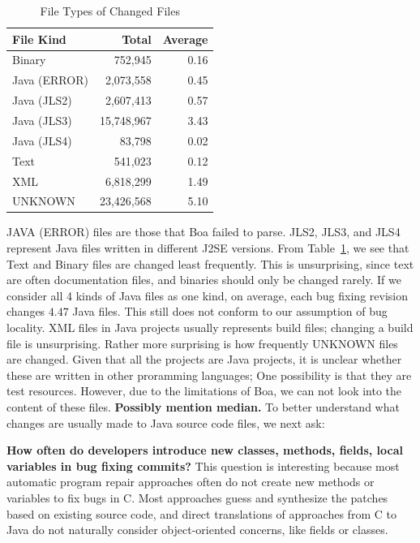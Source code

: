 \documentclass{sig-alternate-05-2015}
\newcommand{\todo}[1]
  {{\scriptsize \textbf{\color{red} {#1}}}}
\begin{document}
\begin{table}
\centering
  \begin{tabular}{ l | r  r }
  \toprule
  File Kind & Total & Average \\ 
  \midrule
  Binary & 752,945 & 0.16 \\ 
  Java (ERROR) & 2,073,558 & 0.45 \\ 
  Java (JLS2) & 2,607,413 & 0.57 \\ 
  Java (JLS3) & 15,748,967 & 3.43 \\
  Java (JLS4)  & 83,798 & 0.02 \\ 
  Text & 541,023 & 0.12 \\ 
  XML & 6,818,299 & 1.49 \\ 
  UNKNOWN & 23,426,568 & 5.10 \\ 
  \end{tabular}
  \caption{File Types of Changed Files}
  \label{tbl:fileType}
\end{table}

JAVA (ERROR) files are those that Boa failed to parse. JLS2,
JLS3, and JLS4 represent Java files written in different J2SE versions. From
Table~\ref{tbl:fileType}, we see that Text and Binary files are
changed least frequently. This is unsurprising, since text are often
documentation files, and binaries should only be changed rarely. If we consider all 4 kinds of Java
files as one kind, on average, each bug fixing revision changes $4.47$ Java
files. This still does not conform to our assumption of bug locality. XML
files in Java projects usually represents build files; changing a build
file is unsurprising.  Rather more surprising is how frequently UNKNOWN files
are changed. Given that all the projects are Java projects, 
it is unclear whether these are written in other proramming
languages; One possibility is
that they are test resources. However, due to the limitations of Boa, we can not
look into the content of these files. 
\todo{Possibly mention median.} 
To better understand what changes are usually made to Java source code
files, we next ask:

\vspace{1ex}
\noindent\textbf{How often do developers introduce new classes, methods, fields,
	local variables in
bug fixing commits?} 
%
This question is interesting because most automatic program repair approaches
often do not create new methods or variables to fix bugs in C.
Most approaches guess and synthesize the patches based on existing source code,
and direct translations of approaches from C to Java do not naturally consider
object-oriented concerns, like fields or classes. 
\end{document}
